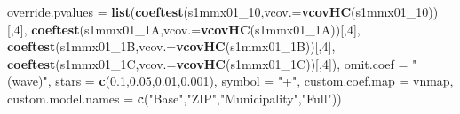 \documentclass[
]{article}
\newenvironment{Shaded}{\begin{snugshade}}{\end{snugshade}}
\newcommand{\DataTypeTok}[1]{\textcolor[rgb]{0.13,0.29,0.53}{#1}}
\newcommand{\DecValTok}[1]{\textcolor[rgb]{0.00,0.00,0.81}{#1}}
\newcommand{\FloatTok}[1]{\textcolor[rgb]{0.00,0.00,0.81}{#1}}
\newcommand{\KeywordTok}[1]{\textcolor[rgb]{0.13,0.29,0.53}{\textbf{#1}}}
\newcommand{\NormalTok}[1]{#1}
\newcommand{\StringTok}[1]{\textcolor[rgb]{0.31,0.60,0.02}{#1}}
\begin{document}
\begin{Shaded}
\begin{Highlighting}[]
          \DataTypeTok{override.pvalues =} \KeywordTok{list}\NormalTok{(}\KeywordTok{coeftest}\NormalTok{(s1mmx01_}\DecValTok{10}\NormalTok{,}\DataTypeTok{vcov.=}\KeywordTok{vcovHC}\NormalTok{(s1mmx01_}\DecValTok{10}\NormalTok{))[,}\DecValTok{4}\NormalTok{],}
                                  \KeywordTok{coeftest}\NormalTok{(s1mmx01_1A,}\DataTypeTok{vcov.=}\KeywordTok{vcovHC}\NormalTok{(s1mmx01_1A))[,}\DecValTok{4}\NormalTok{],}
                                  \KeywordTok{coeftest}\NormalTok{(s1mmx01_1B,}\DataTypeTok{vcov.=}\KeywordTok{vcovHC}\NormalTok{(s1mmx01_1B))[,}\DecValTok{4}\NormalTok{],}
                                  \KeywordTok{coeftest}\NormalTok{(s1mmx01_1C,}\DataTypeTok{vcov.=}\KeywordTok{vcovHC}\NormalTok{(s1mmx01_1C))[,}\DecValTok{4}\NormalTok{]),}
          \DataTypeTok{omit.coef =} \StringTok{"(wave)"}\NormalTok{, }\DataTypeTok{stars =} \KeywordTok{c}\NormalTok{(}\FloatTok{0.1}\NormalTok{,}\FloatTok{0.05}\NormalTok{,}\FloatTok{0.01}\NormalTok{,}\FloatTok{0.001}\NormalTok{), }\DataTypeTok{symbol =} \StringTok{"+"}\NormalTok{,}
          \DataTypeTok{custom.coef.map =}\NormalTok{ vnmap, }
          \DataTypeTok{custom.model.names =} \KeywordTok{c}\NormalTok{(}\StringTok{"Base"}\NormalTok{,}\StringTok{"ZIP"}\NormalTok{,}\StringTok{"Municipality"}\NormalTok{,}\StringTok{"Full"}\NormalTok{))}
\end{Highlighting}
\end{Shaded}
\end{document}
